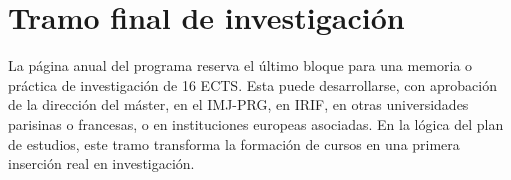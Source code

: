 \documentclass[a4paper,11pt]{article}
\begin{document}
\normalsize

\section*{Tramo final de investigación}

La página anual del programa reserva el último bloque para una memoria o práctica de investigación de 16 ECTS. Esta puede desarrollarse, con aprobación de la dirección del máster, en el IMJ-PRG, en IRIF, en otras universidades parisinas o francesas, o en instituciones europeas asociadas. En la lógica del plan de estudios, este tramo transforma la formación de cursos en una primera inserción real en investigación.
\end{document}

